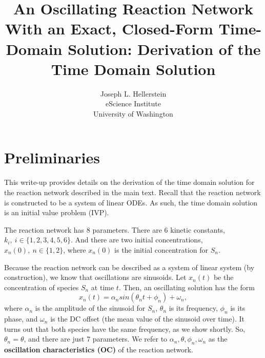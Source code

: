 \documentclass[11pt]{article}
\title{An Oscillating Reaction Network With an Exact, Closed-Form Time-Domain Solution: Derivation of the Time Domain Solution}
\author{Joseph L. Hellerstein\\ eScience Institute\\ University of Washington}
\begin{document}
    
    \maketitle
    
\section{Preliminaries}

This write-up provides details on the derivation of the
time domain solution for the reaction network described in the main text.
Recall that the reaction network is constructed to be a system
of linear ODEs.
As such, the time domain solution is an initial value problem (IVP).


    The reaction network has 8 parameters. There are 6 kinetic constants,
$k_i,~ i\in \{1, 2, 3, 4, 5, 6\}$. And there are two initial
concentrations, $x_n (0),~ n \in \{1, 2 \}$, where $x_n(0)$ is the
initial concentration for $S_n$.

Because the reaction network can be described as a 
system of linear system (by construction), we
know that oscillations are sinusoids.
Let $x_n (t)$ be the concentration
of species $S_n$ at time $t$. Then, an oscillating solution has the
form \begin{equation*}
x_n(t) = \alpha_n sin(\theta_n t + \phi_n) + \omega_n,
\end{equation*} where $\alpha_n$ is the amplitude of the sinusoid for
$S_n$, $\theta_n$ is its frequency, $\phi_n$ is its phase, and
$\omega_n$ is the DC offset (the mean value of the sinusoid over
time).
It turns out that both species have the same frequency, as we show shortly.
So, $\theta_n = \theta$, and there are just 7 parameters.
We refer to $\alpha_n, \theta, \phi_n, \omega_n$ as the
\textbf{oscillation characteristics (OC)} of the reaction network.
\end{document}
